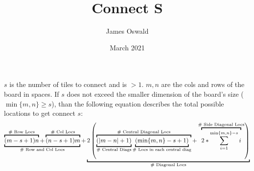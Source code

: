 \documentclass{article}
\title{Connect S}
\author{James Oswald}
\date{March 2021}
\begin{document}
\maketitle
\noindent
$s$ is the number of tiles to connect and is $>1$. $m,n$ are the cols and rows of the board in spaces. If $s$ does not exceed the smaller dimension of the board's size ($\min\{m,n\} \geq s$), than the following equation describes the total possible locations to get connect $s$:
\[
\underbracket{\overbracket{(m-s+1)n}^{\text{\normalfont \# Row Locs}}+\overbracket{(n-s+1)m}^{\text{\normalfont \# Col Locs}}}_{\text{\normalfont \# Row and Col Locs}}+\underbracket{2\left(\overbracket{\underbracket{(|m-n|+1)}_{\text{\normalfont \# Central Diags}}\underbracket{(\min\{m,n\}-s+1)}_{\text{\normalfont \# Locs in each central diag}}}^{\text{\normalfont \# Central Diagonal Locs}} + \overbracket{2 *\sum_{i = 1}^{\min\{m,n\}-s}i}^{\text{\normalfont \# Side Diagonal Locs}}\right)}_{\text{\normalfont \# Diagonal Locs}}
\]
\end{document}
